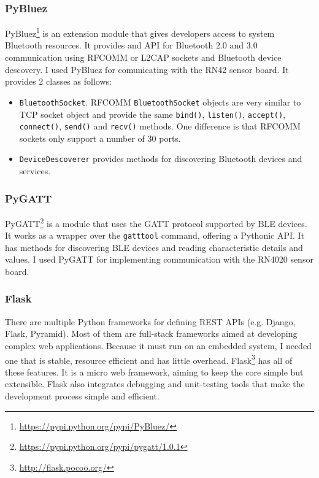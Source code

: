 \subsubsection{PyBluez}

PyBluez\footnote{\url{https://pypi.python.org/pypi/PyBluez/}} is an extension module that gives developers access to system Bluetooth resources. It provides and API for Bluetooth 2.0 and 3.0 communication using RFCOMM or L2CAP sockets and Bluetooth device descovery. I used PyBluez for comunicating with the RN42 sensor board. It provides 2 classes as follows:
\begin{itemize}
  \item \texttt{BluetoothSocket}. RFCOMM \texttt{BluetoothSocket} objects are very similar to TCP socket object and provide the same \texttt{bind()}, \texttt{listen()}, \texttt{accept()}, \texttt{connect()}, \texttt{send()} and \texttt{recv()} methods. One difference is that RFCOMM sockets only support a number of 30 ports.
  \item \texttt{DeviceDescoverer} provides methods for discovering Bluetooth devices and services.
\end{itemize}

\subsubsection{PyGATT}

PyGATT\footnote{\url{https://pypi.python.org/pypi/pygatt/1.0.1}} is a module that uses the GATT protocol supported by BLE devices. It works as a wrapper over the \texttt{gatttool} command, offering a Pythonic API. It has methods for discovering BLE devices and reading characteristic details and values. I used PyGATT for implementing communication with the RN4020 sensor board.

\subsubsection{Flask}

There are multiple Python frameworks for defining REST APIs (e.g. Django, Flask, Pyramid). Most of them are full-stack frameworks aimed at developing complex web applications. Because it must run on an embedded system, I needed one that is stable, resource efficient and has little overhead. Flask\footnote{\url{http://flask.pocoo.org/}} has all of these features. It is a micro web framework, aiming to keep the core simple but extensible. Flask also integrates debugging and unit-testing tools that make the development process simple and efficient.

